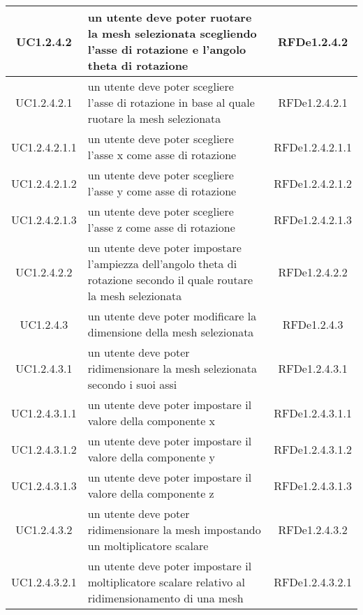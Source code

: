 \begin{longtable}{|c|p{7cm}|c|}
\midrule
UC1.2.4.2
& un utente deve poter ruotare la mesh selezionata scegliendo l’asse di rotazione e l’angolo theta di rotazione
& RFDe1.2.4.2 \\


\midrule
UC1.2.4.2.1
& un utente deve poter scegliere l'asse di rotazione in base al quale ruotare la mesh selezionata
& RFDe1.2.4.2.1 \\


\midrule
UC1.2.4.2.1.1
& un utente deve poter scegliere l'asse x come asse di rotazione
& RFDe1.2.4.2.1.1 \\


\midrule
UC1.2.4.2.1.2
& un utente deve poter scegliere l'asse y come asse di rotazione
& RFDe1.2.4.2.1.2 \\


\midrule
UC1.2.4.2.1.3
& un utente deve poter scegliere l'asse z come asse di rotazione
& RFDe1.2.4.2.1.3 \\


\midrule
UC1.2.4.2.2
& un utente deve poter impostare l'ampiezza dell'angolo theta di rotazione secondo il quale routare la mesh selezionata
& RFDe1.2.4.2.2 \\


\midrule
UC1.2.4.3
& un utente deve poter modificare la dimensione della mesh selezionata
& RFDe1.2.4.3 \\


\midrule
UC1.2.4.3.1
& un utente deve poter ridimensionare la mesh selezionata secondo i suoi assi
& RFDe1.2.4.3.1 \\


\midrule
UC1.2.4.3.1.1
& un utente deve poter impostare il valore della componente x
& RFDe1.2.4.3.1.1 \\


\midrule
UC1.2.4.3.1.2
& un utente deve poter impostare il valore della componente y
& RFDe1.2.4.3.1.2 \\


\midrule
UC1.2.4.3.1.3
& un utente deve poter impostare il valore della componente z
& RFDe1.2.4.3.1.3 \\


\midrule
UC1.2.4.3.2
& un utente deve poter ridimensionare la mesh impostando un moltiplicatore scalare
& RFDe1.2.4.3.2 \\


\midrule
UC1.2.4.3.2.1
& un utente deve poter impostare il moltiplicatore scalare relativo al ridimensionamento di una mesh
& RFDe1.2.4.3.2.1 \\



\end{longtable}
